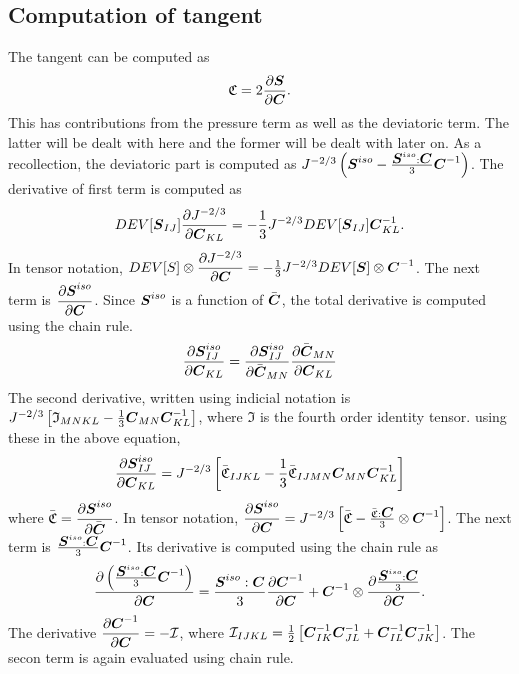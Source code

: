 \documentclass[11pt,a4paper]{article}
\newcommand{\parder}[2]{{\dfrac{\partial #1}{\partial #2}}}
\begin{document}
\subsection{Computation of tangent}
The tangent can be computed as 
\begin{equation}
	\mathfrak{C} = 2 \parder{\bfS}{\bfC}.
\end{equation}
This has contributions from the pressure term as well as the deviatoric term. The latter will be dealt with here and the former will be dealt with later on. As a recollection, the deviatoric part is computed as $J^{-2/3} \left(\mbox{\boldmath $S$}^{iso}-\frac{\mbox{\boldmath $S$}^{iso}:\mbox{\boldmath $C$}}{3}\mbox{\boldmath $C$}^{-1} \right)$. The derivative of first term is computed as 
\begin{equation}
DEV[\bfS_{IJ}] \parder{J^{-2/3}}{\bfC_{KL}}= -\frac{1}{3} J^{-2/3} DEV[\bfS_{IJ}] {\bfC^{-1}_{KL}}.
\end{equation}
In tensor notation, $DEV[S] \otimes \parder{J^{-2/3}}{\bfC} = -\frac{1}{3} J^{-2/3} DEV[\bfS]  \otimes {\bfC^{-1}}$. The next term is $\parder{\bfS^{iso}}{\bfC}$. Since $\mbox{\boldmath $S$}^{iso}$ is a function of $\bar{\mbox{\boldmath $C$}}$, the total derivative is computed using the chain rule.
\begin{equation}
 \parder{\bfS^{iso}_{IJ}}{\bfC_{KL}} =  \parder{\bfS^{iso}_{IJ}}{\bar{\bfC}_{MN}} \parder{\bar{\bfC}_{MN}}{{\bfC}_{KL}}
\end{equation}
The second derivative, written using indicial notation is $J^{-2/3}\left[\mathfrak{I}_{MNKL}- \frac{1}{3} \mbox{\boldmath $C$}_{MN} \mbox{\boldmath $C$}^{-1}_{KL}   \right]$, where $\mathfrak{I}$ is the fourth order identity tensor. using these in the above equation,
\begin{equation}
\parder{\bfS^{iso}_{IJ}}{\bfC_{KL}} =  J^{-2/3}\left[\bar{\mathfrak{C}}_{IJKL}- \frac{1}{3} \bar{\mathfrak{C}}_{IJMN} \bfC_{MN} \bfC^{-1}_{KL} \right]  
\end{equation}
where $\bar{\mathfrak{C}} = \parder{\bfS^{iso}}{\bfCbar}$. In tensor notation, $\parder{\bfS^{iso}}{\bfC} = J^{-2/3}\left[\bar{\mathfrak{C}}- \frac{\bar{\mathfrak{C}}: \bfC}{3}  \otimes \bfC^{-1} \right]$. The next term is $\frac{\mbox{\boldmath $S$}^{iso}:\mbox{\boldmath $C$}}{3}\mbox{\boldmath $C$}^{-1}$. Its derivative is computed using the chain rule as
\begin{equation}
	\parder{\left( \frac{\bfS^{iso}:\bfC}{3}\bfC^{-1} \right)}{\bfC} = \frac{\bfS^{iso}:\bfC}{3} \parder{\bfCinv}{\bfC} + \bfCinv \otimes \parder{\frac{\bfS^{iso}:\bfC}{3}}{\bfC}.
\end{equation} 
The derivative $\parder{\bfCinv}{\bfC} = -\mathcal{I}$, where $\mathcal{I}_{IJKL} = \frac{1}{2} \left[ {\mbox{\boldmath $C$}}^{-1}_{IK} {\mbox{\boldmath $C$}}^{-1}_{JL} + {\mbox{\boldmath $C$}}^{-1}_{IL} {\mbox{\boldmath $C$}}^{-1}_{JK} \right] $. The secon term is again evaluated using chain rule.
\end{document}
